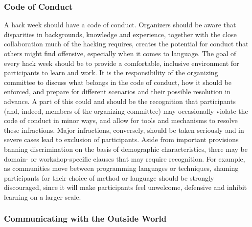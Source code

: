 \subsubsection{Code of Conduct}

A hack week should have a code of conduct. Organizers should be aware that disparities in backgrounds, knowledge and experience, together with the close collaboration much of the hacking requires, creates the potential for conduct that others might find offensive, especially when it comes to language. The goal of every hack week should be to provide a comfortable, inclusive environment for participants to learn and work. It is the responsibility of the organizing committee to discuss what belongs in the code of conduct, how it should be enforced, and prepare for different scenarios and their possible resolution in advance.
A part of this could and should be the recognition that participants (and, indeed, members of the organizing committee) may occasionally violate the code of conduct in minor ways, and allow for tools and mechanisms to resolve these infractions. Major infractions, conversely, should be taken seriously and in severe cases lead to exclusion of participants.
Aside from important provisions banning discrimination on the basis of demographic characteristics, there may be domain- or workshop-specific clauses that may require recognition. For example, as communities move between programming languages or techniques, shaming participants for their choice of method or language should be strongly discouraged, since it will make participants feel unwelcome, defensive and inhibit learning on a larger scale.

\subsubsection{Communicating with the Outside World}

